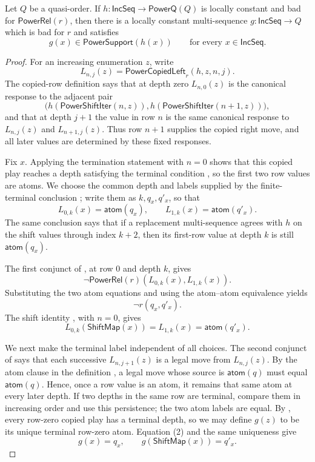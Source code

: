 \begin{theorem}
Let $Q$ be a quasi-order.  If
$h:\mathsf{IncSeq}\to\mathsf{PowerQ}(Q)$ is locally constant and bad for
$\mathsf{PowerRel}(r)$, then there is a locally constant multi-sequence
$g:\mathsf{IncSeq}\to Q$ which is bad for $r$ and satisfies
\[
g(x)\in\mathsf{PowerSupport}(h(x))
\qquad\text{for every }x\in\mathsf{IncSeq}.
\]
\end{theorem}
\begin{proof}
For an increasing enumeration $z$, write
\[
L_{n,j}(z)=\mathsf{PowerCopiedLeft}_r(h,z,n,j).
\]
The copied-row definition  says that at depth zero
$L_{n,0}(z)$ is the canonical response  to the
adjacent pair
\[
\bigl(h(\mathsf{PowerShiftIter}(n,z)),
      h(\mathsf{PowerShiftIter}(n+1,z))\bigr),
\]
and that at depth $j+1$ the value in row $n$ is the same canonical response
to $L_{n,j}(z)$ and $L_{n+1,j}(z)$.  Thus row $n+1$ supplies the copied right
move, and all later values are determined by these fixed responses.

Fix $x$.  Applying the termination statement
 with $n=0$ shows that this copied play
reaches a depth satisfying the terminal condition
, so the first two row values are atoms.  We choose the
common depth and labels supplied by the finite-terminal conclusion
; write them as $k,q_x,q'_x$, so that
\[
L_{0,k}(x)=\mathsf{atom}(q_x),\qquad
L_{1,k}(x)=\mathsf{atom}(q'_x).
\]
The same conclusion says that if a replacement multi-sequence agrees with
$h$ on the shift values through index $k+2$, then its first-row value at
depth $k$ is still $\mathsf{atom}(q_x)$.

The first conjunct of , at row $0$ and
depth $k$, gives
\[
\neg\mathsf{PowerRel}(r)(L_{0,k}(x),L_{1,k}(x)).
\]
Substituting the two atom equations and using the atom--atom equivalence
 yields
\[
\neg r(q_x,q'_x). \tag{1}
\]
The shift identity , with $n=0$, gives
\[
L_{0,k}(\mathsf{ShiftMap}(x))=L_{1,k}(x)
  =\mathsf{atom}(q'_x). \tag{2}
\]

We next make the terminal label independent of all choices.  The second
conjunct of  says that each successive
$L_{n,j+1}(z)$ is a legal move from $L_{n,j}(z)$.  By the atom clause in the
definition , a legal move whose source is
$\mathsf{atom}(q)$ must equal $\mathsf{atom}(q)$.  Hence, once a row value is
an atom, it remains that same atom at every later depth.  If two depths in
the same row are terminal, compare them in increasing order and use this
persistence; the two atom labels are equal.  By
, every row-zero copied play has a terminal
depth, so we may define $g(z)$ to be its unique terminal row-zero atom.
Equation (2) and the same uniqueness give
\[
g(x)=q_x,\qquad g(\mathsf{ShiftMap}(x))=q'_x. \tag{3}
\]


\end{proof}
